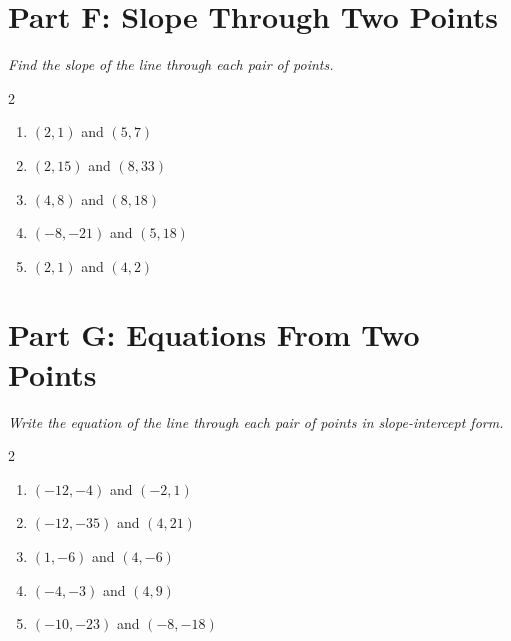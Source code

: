 \documentclass[11pt]{article}
\begin{document}
\section*{Part F: Slope Through Two Points}
\noindent\textit{Find the slope of the line through each pair of points.}
\begin{multicols}{2}
\begin{enumerate}
  \item $(2, 1)$ and $(5, 7)$
  \vspace{1.6cm}
  \item $(2, 15)$ and $(8, 33)$
  \vspace{1.6cm}
  \item $(4, 8)$ and $(8, 18)$
  \vspace{1.6cm}
  \item $(-8, -21)$ and $(5, 18)$
  \vspace{1.6cm}
  \item $(2, 1)$ and $(4, 2)$
  \vspace{1.6cm}
\end{enumerate}
\end{multicols}

\section*{Part G: Equations From Two Points}
\noindent\textit{Write the equation of the line through each pair of points in slope-intercept form.}
\begin{multicols}{2}
\begin{enumerate}
  \item $(-12, -4)$ and $(-2, 1)$
  \vspace{2.0cm}
  \item $(-12, -35)$ and $(4, 21)$
  \vspace{2.0cm}
  \item $(1, -6)$ and $(4, -6)$
  \vspace{2.0cm}
  \item $(-4, -3)$ and $(4, 9)$
  \vspace{2.0cm}
  \item $(-10, -23)$ and $(-8, -18)$
  \vspace{2.0cm}
\end{enumerate}
\end{multicols}
\end{document}
